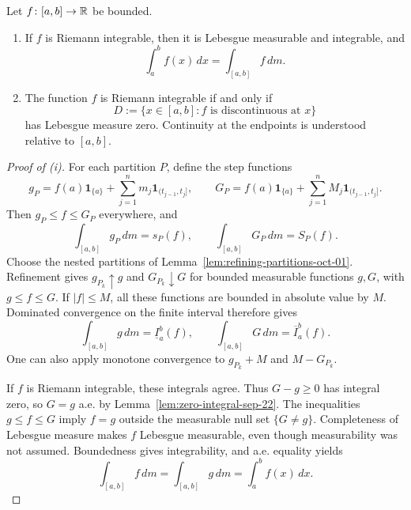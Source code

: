 \begin{theorem}
  \label{thm:riemann-lebesgue-oct-01}
  Let $f\colon[a,b]\to\mathbb{R}$ be bounded.
  \begin{enumerate}[label=(\roman*)]
    \item If $f$ is Riemann integrable, then it is Lebesgue measurable
      and integrable, and
      \[
        \int_a^b f(x)\,dx=\int_{[a,b]}f\,dm.
      \]
    \item The function $f$ is Riemann integrable if and only if
      \[
        D:=\{x\in[a,b]:f\text{ is discontinuous at }x\}
      \]
      has Lebesgue measure zero. Continuity at the endpoints is
      understood relative to $[a,b]$.
  \end{enumerate}
\end{theorem}

\begin{proof}[Proof of (i)]
  For each partition $P$, define the step functions
  \[
    g_P=f(a)\mathbf 1_{\{a\}}
      +\sum_{j=1}^n m_j\mathbf 1_{(t_{j-1},t_j]},\qquad
    G_P=f(a)\mathbf 1_{\{a\}}
      +\sum_{j=1}^n M_j\mathbf 1_{(t_{j-1},t_j]}.
  \]
  Then $g_P\leq f\leq G_P$ everywhere, and
  \[
    \int_{[a,b]}g_P\,dm=s_P(f),\qquad
    \int_{[a,b]}G_P\,dm=S_P(f).
  \]
  Choose the nested partitions of
  Lemma~\ref{lem:refining-partitions-oct-01}. Refinement gives
  $g_{P_k}\uparrow g$ and $G_{P_k}\downarrow G$ for bounded
  measurable functions $g,G$, with $g\leq f\leq G$. If $|f|\leq M$,
  all these functions are bounded in absolute value by $M$.
  Dominated convergence on the finite interval therefore gives
  \[
    \int_{[a,b]}g\,dm=\underline I_a^b(f),\qquad
    \int_{[a,b]}G\,dm=\overline I_a^b(f).
  \]
  One can also apply monotone convergence to $g_{P_k}+M$ and
  $M-G_{P_k}$.

  If $f$ is Riemann integrable, these integrals agree. Thus
  $G-g\geq0$ has integral zero, so $G=g$ a.e. by
  Lemma~\ref{lem:zero-integral-sep-22}. The inequalities
  $g\leq f\leq G$ imply $f=g$ outside the measurable null set
  $\{G\neq g\}$. Completeness of Lebesgue measure makes $f$
  Lebesgue measurable, even though measurability was not assumed.
  Boundedness gives integrability, and a.e. equality yields
  \[
    \int_{[a,b]}f\,dm=\int_{[a,b]}g\,dm
      =\int_a^b f(x)\,dx.
  \]
\end{proof}

